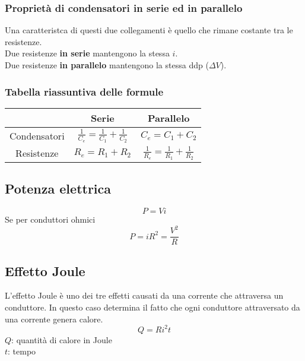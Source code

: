 \subsubsection{Proprietà di condensatori in serie ed in parallelo}
Una caratteristca di questi due collegamenti è quello che rimane costante tra le 
resistenze.\\[\baselineskip]
Due resistenze \textbf{in serie} mantengono la stessa $i$.\\
Due resistenze \textbf{in parallelo} mantengono la stessa ddp ($\Delta V$).

\subsubsection{Tabella riassuntiva delle formule}

\begin{center}
      \begin{tabular}{c | c | c}
        & Serie & Parallelo \\ \midrule
        Condensatori & $\frac{1}{C_e} = \frac{1}{C_1} + \frac{1}{C_2}$ & $C_e = C_1 + C_2$\\
        Resistenze & $R_e = R_1 + R_2$ & $\frac{1}{R_e} = \frac{1}{R_1} + \frac{1}{R_2}$\\
    \end{tabular}
\end{center}

\subsection{Potenza elettrica}
\begin{equation*}
P = Vi
\end{equation*}
Se per conduttori ohmici
\begin{equation*}
P = iR^2 = \frac{V^2}{R}
\end{equation*}

\subsection{Effetto Joule}
L'effetto Joule è uno dei tre effetti causati da una corrente che attraversa un conduttore. 
In questo caso determina il fatto che ogni conduttore attraversato da una corrente genera calore.
\begin{equation*}
Q = Ri^2t
\end{equation*}
$Q$: quantità di calore in Joule\\
$t$: tempo\\ [\baselineskip]

